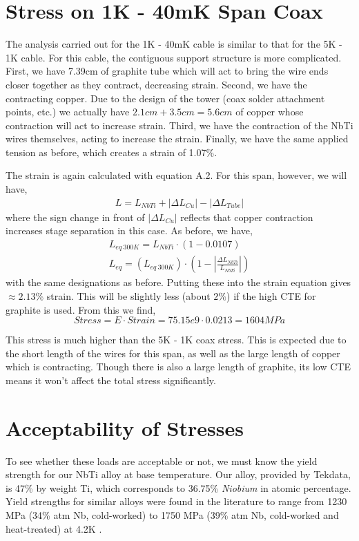 \documentclass{report}
\begin{document}
\begin{appendices}
\section{Stress on 1K - 40mK Span Coax}

The analysis carried out for the 1K - 40mK cable is similar to that for the 5K - 1K cable. For this cable, the contiguous support structure is more complicated. First, we have 7.39cm of graphite tube which will act to bring the wire ends closer together as they contract, decreasing strain. Second, we have the contracting copper. Due to the design of the tower (coax solder attachment points, etc.) we actually have $2.1cm + 3.5cm = 5.6cm$ of copper whose contraction will act to increase strain. Third, we have the contraction of the NbTi wires themselves, acting to increase the strain. Finally, we have the same applied tension as before, which creates a strain of 1.07\%.

The strain is again calculated with equation A.2. For this span, however, we will have,
\begin{eqnarray}
L = L_{NbTi} + |\Delta L_{Cu}| - |\Delta L_{Tube}|
\end{eqnarray}
where the sign change in front of $|\Delta L_{Cu}|$ reflects that copper contraction increases stage separation in this case. As before, we have,
\begin{eqnarray}
L_{eq \ 300K} = L_{NbTi} \cdot (1 - 0.0107) \\
L_{eq} = (L_{eq \ 300K})\cdot\left(1 - \left|\frac{\Delta L_{NbTi}}{L_{NbTi}}\right|\right)
\end{eqnarray}
with the same designations as before. Putting these into the strain equation gives $\approx 2.13 \%$ strain. This will be slightly less (about $2\%$) if the high CTE for graphite is used. From this we find,
$$
Stress = E \cdot Strain = 75.15e9 \cdot 0.0213 = 1604MPa
$$

This stress is much higher than the 5K - 1K coax stress. This is expected due to the short length of the wires for this span, as well as the large length of copper which is contracting. Though there is also a large length of graphite, its low CTE means it won't affect the total stress significantly.

\section{Acceptability of Stresses}

To see whether these loads are acceptable or not, we must know the yield strength for our NbTi alloy at base temperature. Our alloy, provided by Tekdata, is 47\% by weight Ti, which corresponds to 36.75\% \emph{Niobium} in atomic percentage. Yield strengths for similar alloys were found in the literature to range from 1230 MPa (34\% atm Nb, cold-worked) to 1750 MPa (39\% atm Nb, cold-worked and heat-treated) at 4.2K \cite{Collings1986}.


\end{appendices}
\end{document}
